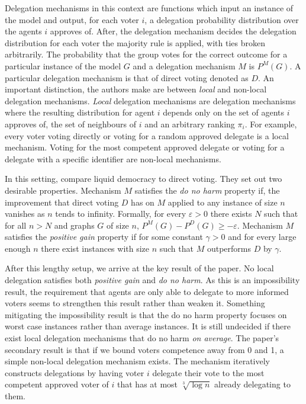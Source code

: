 \documentclass[11pt,a4paper, titlepage]{article}
\theoremstyle{definition}
\begin{document}
Delegation mechanisms in this context are functions which input an instance of the model and output, for each voter $i$, a delegation probability distribution over the agents $i$ approves of.
After, the delegation mechanism decides the delegation distribution for each voter the majority rule is applied, with ties broken arbitrarily.
The probability that the group votes for the correct outcome for a particular instance of the model $G$ and a delegation mechanism $M$ is $P^M(G)$.
A particular delegation mechanism is that of direct voting denoted as $D$.
An important distinction, the authors make are between \emph{local} and non-local delegation mechanisms. \emph{Local} delegation mechanisms are delegation mechanisms where the resulting distribution for agent $i$ depends only on the set of agents $i$ approves of, the set of neighbours of $i$ and an arbitrary ranking $\pi_i$.
For example, every voter voting directly or voting for a random approved delegate is a local mechanism. Voting for the most competent approved delegate or voting for a delegate with a specific identifier are non-local mechanisms.

In this setting, \citeauthor{kahng2021liquid} compare liquid democracy to direct voting. They set out two desirable properties.
Mechanism $M$ satisfies the \emph{do no harm} property if, the improvement that direct voting $D$ has on $M$ applied to any instance of size $n$ vanishes as $n$ tends to infinity.
Formally, for every $\varepsilon > 0$ there exists $N$ such that for all $n > N$ and graphs $G$ of size $n$, $P^M(G) - P^D(G) \geq - \varepsilon$.
Mechanism $M$ satisfies the \emph{positive gain} property if for some constant $\gamma > 0$ and for every large enough $n$ there exist instances with size $n$ such that $M$ outperforms $D$ by $\gamma$.

After this lengthy setup, we arrive at the key result of the paper. No local delegation satisfies both \emph{positive gain} and \emph{do no harm}.
As this is an impossibility result, the requirement that agents are only able to delegate to more informed voters seems to strengthen this result rather than weaken it.
Something mitigating the impossibility result is that the do no harm property focuses on worst case instances rather than average instances.
It is still undecided if there exist local delegation mechanisms that do no harm \emph{on average}.
The paper's secondary result is that if we bound voters competence away from 0 and 1, a simple non-local delegation mechanism exists.
The mechanism iteratively constructs delegations by having voter $i$ delegate their vote to the most competent approved voter of $i$ that has at most $\sqrt[3]{\log n}$ already delegating to them.
\end{document}
